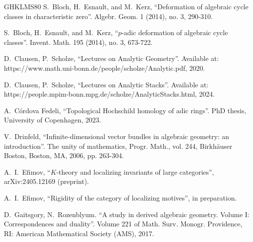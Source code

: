 \documentclass[11pt,leqno]{amsart}
\numberwithin{equation}{section}
\begin{document}
\begin{thebibliography}{GHKLMS80}
S.~Bloch, H.~Esnault, and M.~Kerz, ``Deformation of algebraic cycle classes in characteristic
zero''. Algebr. Geom. 1 (2014), no. 3, 290-310.

S.~Bloch, H.~Esnault, and M.~Kerz, ``$p$-adic deformation of algebraic cycle classes''. Invent. Math. 195 (2014), no. 3, 673-722.



D.~Clausen, P.~Scholze, ``Lectures on Analytic Geometry''. Available at: https://www.math.uni-bonn.de/people/scholze/Analytic.pdf,
2020.

 D.~Clausen, P.~Scholze, ``Lectures on Analytic Stacks''. Available at: https://people.mpim-bonn.mpg.de/scholze/AnalyticStacks.html, 2024.

A.~C\'ordova Fedeli, ``Topological Hochschild homology of adic rings''. PhD thesis, University of Copenhagen, 2023.

 V.~Drinfeld, ``Infinite-dimensional vector bundles in algebraic geometry: an
introduction''. The unity of mathematics, Progr. Math., vol. 244, Birkh\"auser Boston,
Boston, MA, 2006, pp. 263-304.

A.~I.~Efimov, ``$K$-theory and localizing invariants of large categories'',  arXiv:2405.12169 (preprint).

A.~I.~Efimov, ``Rigidity of the category of localizing motives'', in preparation.



 D.~Gaitsgory, N.~Rozenblyum. ``A study in derived algebraic geometry. Volume I: Correspondences and
duality''. Volume 221 of Math. Surv. Monogr. Providence, RI: American Mathematical Society (AMS), 2017.



\end{thebibliography}
\end{document}
